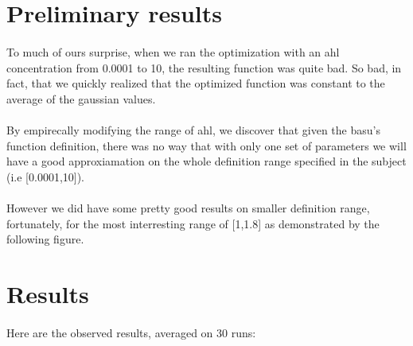 \documentclass{article}
\begin{document}
  \section{Preliminary results} %
  \label{sec:Preliminaty Result}
    
    \paragraph{} %
    \label{par:}
      To much of ours surprise, when we ran the optimization with an ahl concentration
      from 0.0001 to 10, the resulting function was quite bad. So bad, in fact, that
      we quickly realized that the optimized function was constant to the average of
      the gaussian values.
    
    \paragraph{} %
    \label{par:}
      By empirecally modifying the range of ahl, we discover that given the basu's
      function definition, there was no way that with only one set of parameters we will
      have a good approxiamation on the whole definition range specified in the
      subject (i.e [0.0001,10]). 

    \paragraph{} %
    \label{par:}
      However we did have some pretty good results on smaller definition range,
      fortunately, for the most interresting range of [1,1.8] as demonstrated by the
      following figure.

    
   
   \section{Results} %
   \label{sec:Result}
   \paragraph{} %
   
     \label{par:}
       Here are the observed results, averaged on 30 runs:
\end{document}
